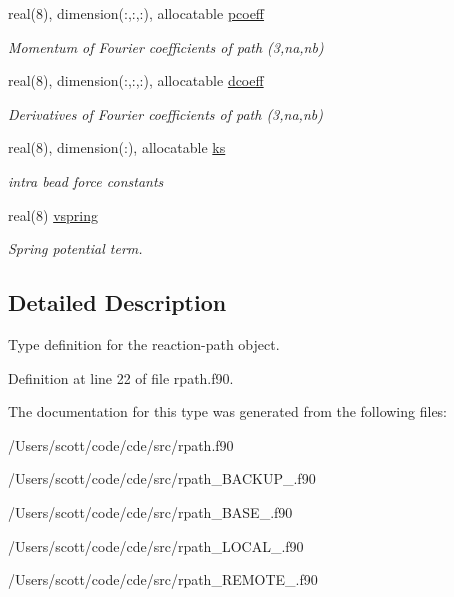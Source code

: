 \begin{DoxyCompactItemize}
\mbox{\label{structrpath_1_1rxp_ae7639d542239ad0e049adeba3234cb6a}} 
real(8), dimension(\+:,\+:,\+:), allocatable \mbox{\hyperlink{structrpath_1_1rxp_ae7639d542239ad0e049adeba3234cb6a}{pcoeff}}
\begin{DoxyCompactList}\small\item\em Momentum of Fourier coefficients of path (3,na,nb) \end{DoxyCompactList}\item 
\mbox{\label{structrpath_1_1rxp_ac6dba38b2c6d98d41a510e2321ef47de}} 
real(8), dimension(\+:,\+:,\+:), allocatable \mbox{\hyperlink{structrpath_1_1rxp_ac6dba38b2c6d98d41a510e2321ef47de}{dcoeff}}
\begin{DoxyCompactList}\small\item\em Derivatives of Fourier coefficients of path (3,na,nb) \end{DoxyCompactList}\item 
\mbox{\label{structrpath_1_1rxp_aa402eef960ff8e6c47d1d3b8c43ff7a4}} 
real(8), dimension(\+:), allocatable \mbox{\hyperlink{structrpath_1_1rxp_aa402eef960ff8e6c47d1d3b8c43ff7a4}{ks}}
\begin{DoxyCompactList}\small\item\em intra bead force constants \end{DoxyCompactList}\item 
\mbox{\label{structrpath_1_1rxp_a5f900bf11745d1f9a39fdd1628ef29d4}} 
real(8) \mbox{\hyperlink{structrpath_1_1rxp_a5f900bf11745d1f9a39fdd1628ef29d4}{vspring}}
\begin{DoxyCompactList}\small\item\em Spring potential term. \end{DoxyCompactList}\end{DoxyCompactItemize}


\subsection{Detailed Description}
Type definition for the reaction-\/path object. 

Definition at line 22 of file rpath.\+f90.



The documentation for this type was generated from the following files\+:\begin{DoxyCompactItemize}
\item 
/\+Users/scott/code/cde/src/rpath.\+f90\item 
/\+Users/scott/code/cde/src/rpath\+\_\+\+B\+A\+C\+K\+U\+P\+\_.\+f90\item 
/\+Users/scott/code/cde/src/rpath\+\_\+\+B\+A\+S\+E\+\_.\+f90\item 
/\+Users/scott/code/cde/src/rpath\+\_\+\+L\+O\+C\+A\+L\+\_.\+f90\item 
/\+Users/scott/code/cde/src/rpath\+\_\+\+R\+E\+M\+O\+T\+E\+\_.\+f90\end{DoxyCompactItemize}
